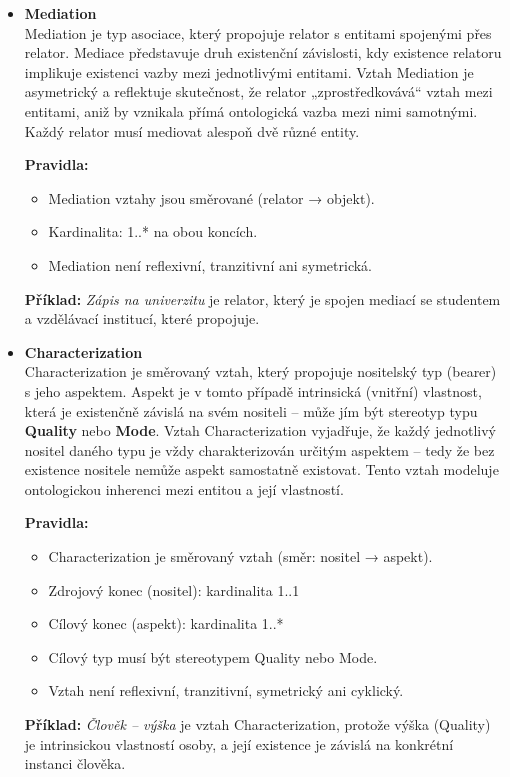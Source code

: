 \begin{itemize}
  \item \textbf{Mediation} \\
  Mediation je typ asociace, který propojuje relator s entitami spojenými přes relator. Mediace představuje druh existenční závislosti, kdy existence relatoru implikuje existenci vazby mezi jednotlivými entitami. Vztah Mediation je asymetrický a reflektuje skutečnost, že relator „zprostředkovává“ vztah mezi entitami, aniž by vznikala přímá ontologická vazba mezi nimi samotnými. Každý relator musí mediovat alespoň dvě různé entity. \cite{KOM_prezentace3,ontouml_relations}

  \textbf{Pravidla:}
  \begin{itemize}
    \item Mediation vztahy jsou směrované (relator → objekt).
    \item Kardinalita: 1..* na obou koncích.
    \item Mediation není reflexivní, tranzitivní ani symetrická. \cite{ontouml_relations}
  \end{itemize}

  \textbf{Příklad:} \textit{Zápis na univerzitu} je relator, který je spojen mediací se studentem a vzdělávací institucí, které propojuje.

  \item \textbf{Characterization} \\
  Characterization je směrovaný vztah, který propojuje nositelský typ (bearer) s jeho aspektem. Aspekt je v tomto případě intrinsická (vnitřní) vlastnost, která je existenčně závislá na svém nositeli – může jím být stereotyp typu \textbf{Quality} nebo \textbf{Mode}. Vztah Characterization vyjadřuje, že každý jednotlivý nositel daného typu je vždy charakterizován určitým aspektem – tedy že bez existence nositele nemůže aspekt samostatně existovat. Tento vztah modeluje ontologickou inherenci mezi entitou a její vlastností.

  \textbf{Pravidla:}
  \begin{itemize}
    \item Characterization je směrovaný vztah (směr: nositel → aspekt).
    \item Zdrojový konec (nositel): kardinalita 1..1
    \item Cílový konec (aspekt): kardinalita 1..*
    \item Cílový typ musí být stereotypem Quality nebo Mode.
    \item Vztah není reflexivní, tranzitivní, symetrický ani cyklický.
  \end{itemize}

  \textbf{Příklad:} \textit{Člověk – výška} je vztah Characterization, protože výška (Quality) je intrinsickou vlastností osoby, a její existence je závislá na konkrétní instanci člověka. \cite{KOM_prezentace3,ontouml_relations}


\end{itemize}



